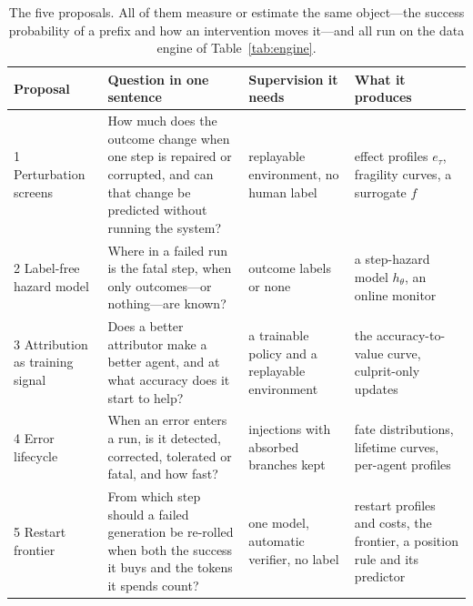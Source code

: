 \begin{table}[htbp]\centering\small
\begin{tabularx}{\linewidth}{@{}l >{\RaggedRight\hsize=1.35\hsize}X >{\RaggedRight\hsize=0.75\hsize}X >{\RaggedRight\hsize=0.9\hsize}X@{}}\toprule
Proposal & Question in one sentence & Supervision it needs & What it produces \\\midrule
1 Perturbation screens & How much does the outcome change when one step is repaired or corrupted, and can that change be predicted without running the system? & replayable environment, no human label & effect profiles $e_\tau$, fragility curves, a surrogate $f$ \\
2 Label-free hazard model & Where in a failed run is the fatal step, when only outcomes---or nothing---are known? & outcome labels or none & a step-hazard model $h_\theta$, an online monitor \\
3 Attribution as training signal & Does a better attributor make a better agent, and at what accuracy does it start to help? & a trainable policy and a replayable environment & the accuracy-to-value curve, culprit-only updates \\
4 Error lifecycle & When an error enters a run, is it detected, corrected, tolerated or fatal, and how fast? & injections with absorbed branches kept & fate distributions, lifetime curves, per-agent profiles \\
5 Restart frontier & From which step should a failed generation be re-rolled when both the success it buys and the tokens it spends count? & one model, automatic verifier, no label & restart profiles and costs, the frontier, a position rule and its predictor \\\bottomrule
\end{tabularx}
\caption{The five proposals. All of them measure or estimate the same object---the success probability of a prefix and how an intervention moves it---and all run on the data engine of Table~\ref{tab:engine}.}
\label{tab:roadmap}
\end{table}







\clearpage


